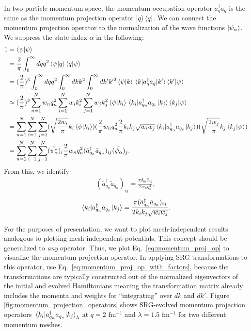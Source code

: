 \documentclass[preprintnumbers,floatfix,aps,prc,preprint,nofootinbib]{revtex4-1}
\begin{document}
In two-particle momentum-space, the momentum occupation operator $a^{\dagger}_q a_q$ is the same as the momentum projection operator $\ket{q} \bra{q}$.
We can connect the momentum projection operator to the normalization of the wave functions $\ket{\psi_{\alpha}}$.
We suppress the state index $\alpha$ in the following:
%
\begin{align}
    \label{eq:momentum_proj_operator_derivation}
    1 &= \bra{\psi} \ket{\psi} \nonumber \\
    &= \frac{2}{\pi} \int_0^{\infty} dq q^2 \bra{\psi} \ket{q} \bra{q} \ket{\psi} \nonumber \\
    &= (\frac{2}{\pi})^3 \int_0^{\infty} dq q^2 \int_0^{\infty} dk k^2 \int_0^{\infty} dk' k'^2 \bra{\psi} \ket{k} \mel{k}{a^{\dagger}_q a_q}{k'} \bra{k'} \ket{\psi} \nonumber \\
    &\approx (\frac{2}{\pi})^3 \sum_{n=1}^{N} w_n q_n^2 \sum_{i=1}^{N} w_i k_i^2 \sum_{j=1}^{N} w_j k_j^2 \bra{\psi} \ket{k_i} \mel{k_i}{a^{\dagger}_{q_n} a_{q_n}}{k_j} \bra{k_j} \ket{\psi} \nonumber \\
    &= \sum_{n=1}^{N} \sum_{i=1}^{N} \sum_{j=1}^{N} ( \sqrt{\frac{2 w_i}{\pi}} k_i \bra{\psi} \ket{k_i} ) ( \frac{2}{\pi} w_n q_n^2 \frac{2}{\pi} k_i k_j \sqrt{w_i w_j} \mel{k_i}{a^{\dagger}_{q_n} a_{q_n}}{k_j} ) ( \sqrt{\frac{2 w_j}{\pi}} k_j \bra{k_j} \ket{\psi} ) \nonumber \\
    &= \sum_{n=1}^{N} \sum_{i=1}^{N} \sum_{j=1}^{N} (\tilde{\psi_{\alpha}^*})_i \frac{2}{\pi} w_n q_n^2 ( \tilde{a}^{\dagger}_{q_n} \tilde{a}_{q_n})_{ij} (\tilde{\psi_{\alpha}})_j.
\end{align}
%
From this, we identify
%
\begin{align}
    \label{eq:momentum_proj_op_with_factors}
    (\tilde{a}^{\dagger}_{q_n} \tilde{a}_{q_n})_{ij} = \frac{\pi \delta_{ni} \delta_{nj}}{2 w_n q_n^2},
\end{align}
%
\begin{align}
    \label{eq:momentum_proj_op}
    \mel{k_i}{a^{\dagger}_{q_n} a_{q_n}}{k_j} = \frac{\pi (\tilde{a}^{\dagger}_{q_n} \tilde{a}_{q_n})_{ij}}{2 k_i k_j \sqrt{w_i w_j}}.
\end{align}
%


For the purposes of presentation, we want to plot mesh-independent results analogous to plotting mesh-independent potentials.
This concept should be generalized to \emph{any} operator.
Thus, we plot Eq.~\ref{eq:momentum_proj_op} to visualize the momentum projection operator.
In applying SRG transformations to this operator, use Eq.~\eqref{eq:momentum_proj_op_with_factors}, because the transformations are typically constructed out of the normalized eigenvectors of the initial and evolved Hamiltonians meaning the transformation matrix already includes the momenta and weights for ``integrating'' over $dk$ and $dk'$.
Figure \ref{fig:momentum_projection_operators} shows SRG-evolved momentum projection operators $\mel{k_i}{a^{\dagger}_{q_n} a_{q_n}}{k_j}_{\lambda}$ at $q=2$ fm$^{-1}$ and $\lambda=1.5$ fm$^{-1}$ for two different momentum meshes.
\end{document}
